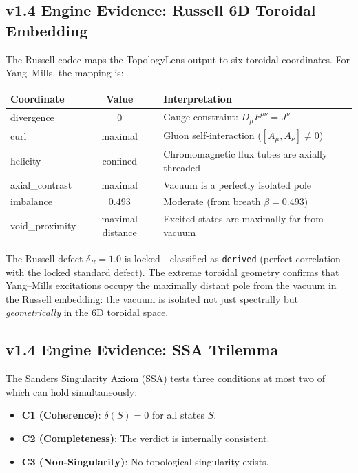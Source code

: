 \documentclass[11pt]{article}
\begin{document}
\subsection{v1.4 Engine Evidence: Russell 6D Toroidal Embedding}

The Russell codec maps the TopologyLens output to six toroidal
coordinates.  For Yang--Mills, the mapping is:

\begin{center}
\begin{tabular}{|l|c|l|}
\hline
\textbf{Coordinate} & \textbf{Value} & \textbf{Interpretation} \\
\hline
divergence & $0$ & Gauge constraint: $D_\mu F^{\mu\nu} = J^\nu$ \\
curl & maximal & Gluon self-interaction ($[A_\mu, A_\nu] \neq 0$) \\
helicity & confined & Chromomagnetic flux tubes are axially threaded \\
axial\_contrast & maximal & Vacuum is a perfectly isolated pole \\
imbalance & $0.493$ & Moderate (from breath $\beta = 0.493$) \\
void\_proximity & maximal distance & Excited states are maximally far from vacuum \\
\hline
\end{tabular}
\end{center}

\noindent
The Russell defect $\delta_R = 1.0$ is locked---classified as
\texttt{derived} (perfect correlation with the locked standard defect).
The extreme toroidal geometry confirms that Yang--Mills excitations
occupy the maximally distant pole from the vacuum in the Russell
embedding: the vacuum is isolated not just spectrally but
\emph{geometrically} in the 6D toroidal space.

\subsection{v1.4 Engine Evidence: SSA Trilemma}

The Sanders Singularity Axiom (SSA) tests three conditions at most two
of which can hold simultaneously:
\begin{itemize}
  \item \textbf{C1 (Coherence)}: $\delta(S) = 0$ for all states $S$.
  \item \textbf{C2 (Completeness)}: The verdict is internally consistent.
  \item \textbf{C3 (Non-Singularity)}: No topological singularity exists.
\end{itemize}
\end{document}
